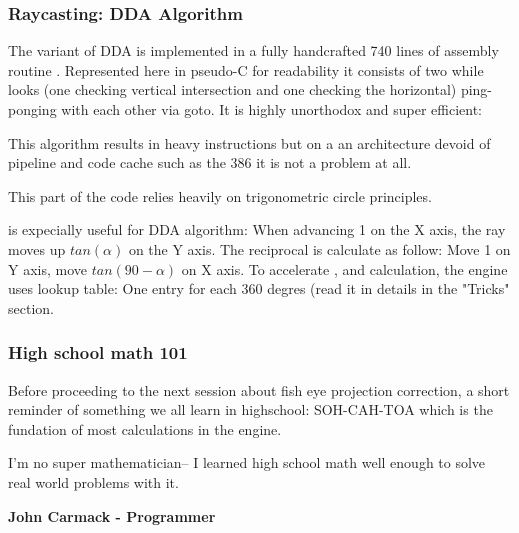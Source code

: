  
 
 
 
 
 
 
 
\subsubsection{Raycasting: DDA Algorithm}
The variant of DDA is implemented in a fully handcrafted 740 lines of assembly routine . Represented here in pseudo-C for readability it consists of two while looks (one checking vertical intersection and one checking the horizontal) ping-ponging with each other via goto. It is highly unorthodox and super efficient:\\
\par



\begin{minipage}{\textwidth}

\end{minipage}
This algorithm results in  heavy instructions but on a an architecture devoid of pipeline and code cache such as the 386 it is not a problem at all.\\
\par
This part of the code relies heavily on trigonometric circle principles.
\begin{figure}[H]
\centering
 
\end{figure}
\par
{} is expecially useful for DDA algorithm: When advancing 1 on the X axis, the ray moves up $tan(\alpha)$ on the Y axis. The reciprocal is calculate as follow: Move 1 on Y axis, move $tan(90-\alpha)$ on X axis. To accelerate ,  and  calculation, the engine uses lookup table: One entry for each 360 degres (read it in details in the "Tricks" section.




















\subsubsection{High school math 101}
Before proceeding to the next session about fish eye projection correction, a short reminder of something we all learn in highschool: SOH-CAH-TOA which is the fundation of most calculations in the engine.\\
\par
 \begin{fancyquotes}
  I'm no super mathematician-- I learned high school math well enough to solve real world problems with it.\\
 \par
\textbf{John Carmack - Programmer}
 \end{fancyquotes}


